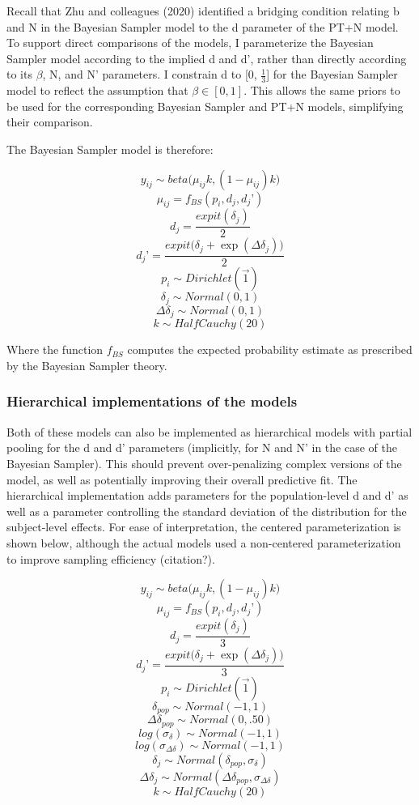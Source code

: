 \documentclass{article}
\begin{document}
Recall that Zhu and colleagues (2020) identified a bridging condition
relating b and N in the Bayesian Sampler model to the d parameter of the
PT+N model. To support direct comparisons of the models, I parameterize
the Bayesian Sampler model according to the implied d and d', rather
than directly according to its \(\beta\), N, and N' parameters. I
constrain d to {[}0, \(\frac{1}{3}\){]} for the Bayesian Sampler model
to reflect the assumption that \(\beta \in [0, 1]\). This allows the
same priors to be used for the corresponding Bayesian Sampler and PT+N
models, simplifying their comparison.

The Bayesian Sampler model is therefore:

\[y_{ij} \sim beta\big(\mu_{ij} k, (1-\mu_{ij})k\big)\]
\[\mu_{ij} = f_{BS}(p_i, d_j, d_j’) \]
\[ d_j = \frac{expit(\delta_j)}{2}\]
\[ d_j’ = \frac{expit\big(\delta_j + \exp(\Delta\delta_j)\big)}{2}\]
\[ p_i \sim Dirichlet(\overrightarrow{1})\]
\[ \delta_j \sim Normal(0,1)\] \[ \Delta\delta_j \sim Normal(0,1)\]
\[ k \sim HalfCauchy(20)\]

Where the function \(f_{BS}\) computes the expected probability estimate
as prescribed by the Bayesian Sampler theory.

\hypertarget{hierarchical-implementations-of-the-models}{%
\subsubsection{Hierarchical implementations of the
models}\label{hierarchical-implementations-of-the-models}}

Both of these models can also be implemented as hierarchical models with
partial pooling for the d and d' parameters (implicitly, for N and N' in
the case of the Bayesian Sampler). This should prevent over-penalizing
complex versions of the model, as well as potentially improving their
overall predictive fit. The hierarchical implementation adds parameters
for the population-level d and d' as well as a parameter controlling the
standard deviation of the distribution for the subject-level effects.
For ease of interpretation, the centered parameterization is shown
below, although the actual models used a non-centered parameterization
to improve sampling efficiency (citation?).

\[y_{ij} \sim beta\big(\mu_{ij} k, (1-\mu_{ij})k\big)\]
\[\mu_{ij} = f_{BS}(p_i, d_j, d_j’) \]
\[d_j = \frac{ expit(\delta_j )}{3}\]
\[ d_j’ = \frac{ expit\big( \delta_j  + \exp(\Delta\delta_j )\big) }{3}\]
\[ p_i \sim Dirichlet(\overrightarrow{1})\]
\[ \delta_{pop} \sim Normal(-1, 1)\]
\[ \Delta\delta_{pop} \sim Normal(0, .50)\]
\[ log(\sigma_{\delta}) \sim Normal(-1, 1)\]
\[ log(\sigma_{\Delta\delta}) \sim Normal(-1, 1)\]
\[\delta_j \sim Normal(\delta_{pop}, \sigma_{\delta})\]
\[\Delta\delta_j \sim Normal(\Delta\delta_{pop}, \sigma_{\Delta\delta})\]
\[k \sim HalfCauchy(20)\]
\end{document}
